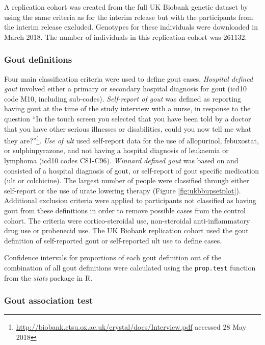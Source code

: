 \documentclass[]{report}
\begin{document}
A replication cohort was created from the full UK Biobank genetic
dataset by using the same criteria as for the interim release but with
the participants from the interim release excluded. Genotypes for these
individuals were downloaded in March 2018. The number of individuals in
this replication cohort was 261132.

\subsubsection{Gout definitions}\label{gout-definitions}

Four main classification criteria were used to define gout cases.
\emph{Hospital defined gout} involved either a primary or secondary
hospital diagnosis for gout (\gls{icd10} code M10, including sub-codes).
\emph{Self-report of gout} was defined as reporting having gout at the
time of the study interview with a nurse, in response to the question
``In the touch screen you selected that you have been told by a doctor
that you have other serious illnesses or disabilities, could you now
tell me what they are?''\footnote{\url{http://biobank.ctsu.ox.ac.uk/crystal/docs/Interview.pdf}
  accessed 28 May 2018}. \emph{Use of \gls{ult}} used self-report data
for the use of allopurinol, febuxostat, or sulphinpyrazone, and not
having a hospital diagnosis of leukaemia or lymphoma (\gls{icd10} codes
C81-C96). \emph{Winnard defined gout} was based on \citet{Winnard2012}
and consisted of a hospital diagnosis of gout, or self-report of gout
specific medication (\gls{ult} or colchicine). The largest number of
people were classified through either self-report or the use of urate
lowering therapy (Figure \ref{fig:ukbbupsetplot}). Additional exclusion
criteria were applied to participants not classified as having gout from
these definitions in order to remove possible cases from the control
cohort. The criteria were cortico-steroidal use, non-steroidal
anti-inflammatory drug use or probenecid use. The UK Biobank replication
cohort used the gout definition of self-reported gout or self-reported
\gls{ult} use to define cases.

Confidence intervals for proportions of each gout definition out of the
combination of all gout definitions were calculated using the
\texttt{prop.test} function from the \emph{stats} package in R.

\subsubsection{Gout association test}\label{gout-association-test}
\end{document}
